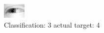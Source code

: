 \begin{figure}[h!]
\begin{center}
\includegraphics[width=0.60\columnwidth]{figures/ID2542_class_3_target_4.png}
\end{center}
\caption{ Classification: 3 actual target: 4}
\label{fig:ID2542_class_3_target_4}
\end{figure}
